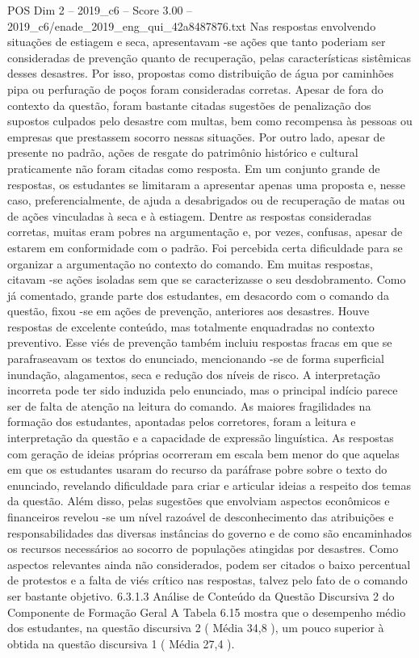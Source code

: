 \begin{textsample}{POS Dim 2 – 2019\_c6 – Score 3.00 – 2019\_c6/enade\_2019\_eng\_qui\_42a8487876.txt}
Nas respostas envolvendo situações de estiagem e seca, apresentavam -se ações que tanto poderiam ser consideradas de prevenção quanto de recuperação, pelas características sistêmicas desses desastres.
Por isso, propostas como distribuição de água por caminhões pipa ou perfuração de poços foram consideradas corretas.
Apesar de fora do contexto da questão, foram bastante citadas sugestões de penalização dos supostos culpados pelo desastre com multas, bem como recompensa às pessoas ou empresas que prestassem socorro nessas situações.
Por outro lado, apesar de presente no padrão, ações de resgate do patrimônio histórico e cultural praticamente não foram citadas como resposta.
Em um conjunto grande de respostas, os estudantes se limitaram a apresentar apenas uma proposta e, nesse caso, preferencialmente, de ajuda a desabrigados ou de recuperação de matas ou de ações vinculadas à seca e à estiagem.
Dentre as respostas consideradas corretas, muitas eram pobres na argumentação e, por vezes, confusas, apesar de estarem em conformidade com o padrão.
Foi percebida certa dificuldade para se organizar a argumentação no contexto do comando.
Em muitas respostas, citavam -se ações isoladas sem que se caracterizasse o seu desdobramento.
Como já comentado, grande parte dos estudantes, em desacordo com o comando da questão, fixou -se em ações de prevenção, anteriores aos desastres.
Houve respostas de excelente conteúdo, mas totalmente enquadradas no contexto preventivo.
Esse viés de prevenção também incluiu respostas fracas em que se parafraseavam os textos do enunciado, mencionando -se de forma superficial inundação, alagamentos, seca e redução dos níveis de risco.
A interpretação incorreta pode ter sido induzida pelo enunciado, mas o principal indício parece ser de falta de atenção na leitura do comando.
As maiores fragilidades na formação dos estudantes, apontadas pelos corretores, foram a leitura e interpretação da questão e a capacidade de expressão linguística.
As respostas com geração de ideias próprias ocorreram em escala bem menor do que aquelas em que os estudantes usaram do recurso da paráfrase pobre sobre o texto do enunciado, revelando dificuldade para criar e articular ideias a respeito dos temas da questão.
Além disso, pelas sugestões que envolviam aspectos econômicos e financeiros revelou -se um nível razoável de desconhecimento das atribuições e responsabilidades das diversas instâncias do governo e de como são encaminhados os recursos necessários ao socorro de populações atingidas por desastres.
Como aspectos relevantes ainda não considerados, podem ser citados o baixo percentual de protestos e a falta de viés crítico nas respostas, talvez pelo fato de o comando ser bastante objetivo. 6.3.1.3 Análise de Conteúdo da Questão Discursiva 2 do Componente de Formação Geral A Tabela 6.15 mostra que o desempenho médio dos estudantes, na questão discursiva 2 ( Média 34,8 ), um pouco superior à obtida na questão discursiva 1 ( Média 27,4 ).

\end{textsample}
